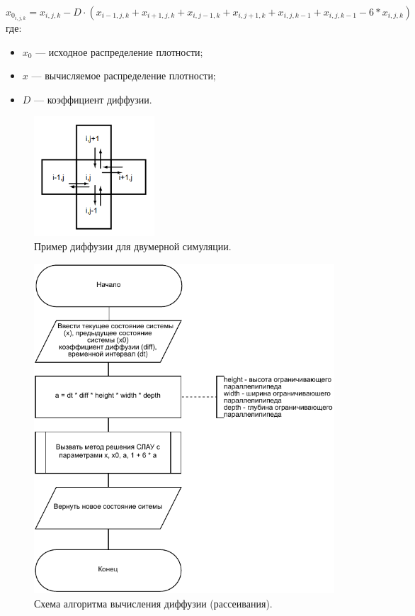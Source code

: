 \begin{equation}
	\label{eq:diffusion}
	x_{0_{i,j,k}} = x_{i,j,k} - D \cdot (x_{i-1,j, k}+x_{i+1,j, k}+x_{i,j-1, k}+x_{i,j+1, k}+x_{i, j, k-1}+x_{i, j, k-1}-6*x_{i,j, k})
\end{equation}
где:
\begin{itemize}
	\item $x_0$ --- исходное распределение плотности;
	\item $x$ --- вычисляемое распределение плотности;
	\item $D$ --- коэффициент диффузии.
\end{itemize}

\begin{figure}[H]
	\centering
	\includegraphics[width=0.4\textwidth, page=1]{assets/img/diffusion.png}   
	\caption{Пример диффузии для двумерной симуляции.}
	\label{fig:diffusion}
\end{figure}

\begin{figure}[H]
	\centering
	\includegraphics[width=1.0\textwidth,page=1]{assets/img/diffuse.pdf}
	\caption{Схема алгоритма вычисления диффузии (рассеивания).}
	\label{fig:diffuse}
\end{figure}

